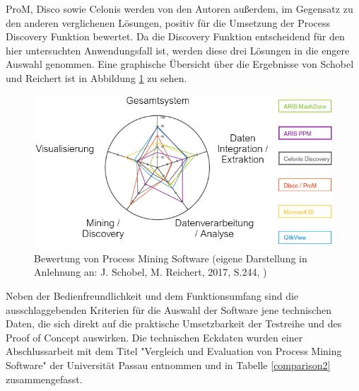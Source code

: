ProM, Disco sowie Celonis werden von den Autoren außerdem, im Gegensatz zu den anderen verglichenen Lösungen, positiv für die Umsetzung der Process Discovery Funktion bewertet. Da die Discovery Funktion entscheidend für den hier untersuchten Anwendungsfall ist, werden diese drei Lösungen in die engere Auswahl genommen.
Eine graphische Übersicht über die Ergebnisse von Schobel und Reichert ist in Abbildung \ref{fig:toolEval} zu sehen.
\begin{figure}[!ht]
    \centering
    \includegraphics[scale=0.6]{figures/Appbildungen/toolEval.PNG}
    \caption{Bewertung von Process Mining Software (eigene Darstellung in Anlehnung an: J. Schobel, M. Reichert, 2017, S.244, \cite{Schobel2017})}
    \label{fig:toolEval}
\end{figure}
\newpage
Neben der Bedienfreundlichkeit und dem Funktionsumfang sind die ausschlaggebenden Kriterien für die Auswahl der Software jene technischen Daten, die sich direkt auf die praktische Umsetzbarkeit der Testreihe und des Proof of Concept auswirken. Die technischen Eckdaten wurden einer Abschlussarbeit mit dem Titel "Vergleich und Evaluation von Process Mining Software" der Universität Passau entnommen \cite{compPM} und in Tabelle \ref{comparison2} zusammengefasst.

